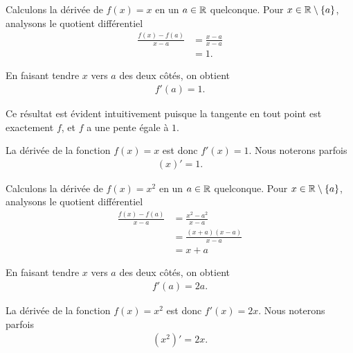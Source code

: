 \documentclass[main.tex]{subfiles}
\begin{document}
\begin{example}
    [Dérivée de $x$]

    Calculons la dérivée de $f(x) = x$ en un $a \in \mathbb{R}$ quelconque.
    Pour $x \in \mathbb{R} \setminus \{a\}$,
    analysons le quotient différentiel
    \begin{align}
        \frac {f(x) - f(a)}{x - a}
        &= \frac {x - a}{x - a}\\
        &= 1.
    \end{align}

    En faisant tendre $x$ vers $a$ des deux côtés,
    on obtient
    \begin{align}
        f'(a) = 1.
    \end{align}

    Ce résultat est évident intuitivement
    puisque la tangente en tout point est exactement $f$,
    et $f$ a une pente égale à $1$.
    \begin{plot}{0.25}{-6}{-6}{6}{6}
    \end{plot}
    
    La dérivée de la fonction $f(x) = x$ est donc $f'(x) = 1$.
    Nous noterons parfois
    \begin{align}
        (x)'=1.
    \end{align}
\end{example}

\begin{example}
    [Dérivée de $x^2$]

    Calculons la dérivée de $f(x) = x^2$ en un $a \in \mathbb{R}$ quelconque.
    Pour $x \in \mathbb{R} \setminus \{a\}$,
    analysons le quotient différentiel
    \begin{align}
        \frac {f(x) - f(a)}{x - a}
        &= \frac {x^2 - a^2}{x - a}\\
        &= \frac {(x + a)(x - a)}{x - a}\\
        &= x + a
    \end{align}

    En faisant tendre $x$ vers $a$ des deux côtés,
    on obtient
    \begin{align}
        f'(a) = 2a.
    \end{align}
    
    La dérivée de la fonction $f(x) = x^2$ est donc $f'(x) = 2x$.
    Nous noterons parfois
    \begin{align}
        (x^2)'=2x.
    \end{align}
\end{example}
\end{document}
